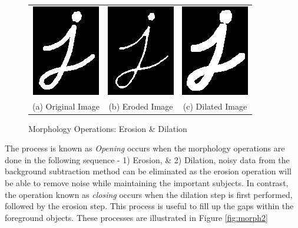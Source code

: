 \begin{figure}[htb!]
  \centering
\begin{tabular}{ccc}
 \includegraphics[width=0.2\linewidth]{image/general/morph_ori.png} &  \includegraphics[width=0.2\linewidth]{image/general/morph_erode.png} &
 \includegraphics[width=0.2\linewidth]{image/general/morph_dilate.png}\\ 
(a) Original Image & (b) Eroded Image & (c) Dilated Image \\
\end{tabular}
\caption{Morphology Operations: Erosion \& Dilation} 
\label{fig:morph}
\end{figure}

The process is known as \textit{Opening} occurs when the morphology operations are done in the following sequence - 1) Erosion, \& 2) Dilation, noisy data from the background subtraction method can be eliminated as the erosion operation will be able to remove noise while maintaining the important subjects. In contrast, the operation known as \textit{closing} occurs when the dilation step is first performed, followed by the erosion step. This process is useful to fill up the gaps within the foreground objects. These processes are illustrated in Figure \ref{fig:morph2}

